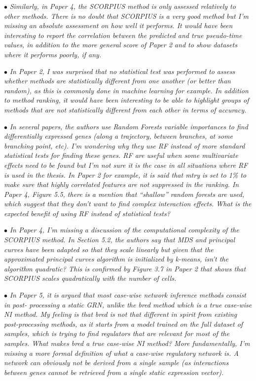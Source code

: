 \documentclass[10pt]{article}
\newcommand{\exam}[2][\  ]{\hspace{0pt}\marginpar{\color{red}#1}$\bullet$ \textit{#2}}
\newcommand{\imp}[1]{{\color{red} #1}}
\newcommand{\bigexclaim}{\raisebox{-0.1em}{\BigTriangleUp}\hspace{-0.32em}\llap{\small\textbf{!}}\hspace{0.32em}}
\newcommand{\tagimp}{\bigexclaim}
\begin{document}
{\exam{Similarly, in Paper 4, the SCORPIUS method is only assessed relatively to other methods.
	There is no doubt that SCORPIUS is a very good method but I’m missing an absolute
	assessment on how well it performs. It would have been interesting to report the correlation
	between the predicted and true pseudo-time values, in addition to the more general score of
	Paper 2 and to show datasets where it performs poorly, if any.}

\exam[\tagimp]{\imp{In Paper 2, I was surprised that no statistical test was performed to assess whether methods
	are statistically different from one another} (or better than random), as this is commonly done
	in machine learning for example. In addition to method ranking, it would have been
	interesting to be able to highlight groups of methods that are not statistically different from
	each other in terms of accuracy.}

\exam[\tagimp]{In several papers, the authors use Random Forests variable importances to find differentially
	expressed genes (along a trajectory, between branches, at some branching point, etc). \imp{I’m
	wondering why they use RF instead of more standard statistical tests for finding these genes.}
	RF are useful when some multivariate effects need to be found but I’m not sure it is the case
	in all situations where RF is used in the thesis. In Paper 2 for example, it is said that mtry is
	set to 1\% to make sure that highly correlated features are not suppressed in the ranking. In
	Paper 4, Figure 5.5, there is a mention that “shallow” random forests are used, which suggest
	that they don’t want to find complex interaction effects. What is the expected benefit of
	using RF instead of statistical tests?}

\exam[\tagimp]{In Paper 4, \imp{I’m missing a discussion of the computational complexity of the SCORPIUS
	method.} In Section 5.2, the authors say that MDS and principal curves have been adapted so
	that they scale linearly but given that the approximated principal curves algorithm is
	initialized by k-means, isn’t the algorithm quadratic? This is confirmed by Figure 3.7 in
	Paper 2 that shows that SCORPIUS scales quadratically with the number of cells.}

\exam[\tagimp]{In Paper 5, it is argued that most case-wise network inference methods consist in post-
	processing a static GRN, unlike the bred method which is a true case-wise NI method. My
	feeling is that bred is not that different in spirit from existing post-processing methods, as it
	starts from a model trained on the full dataset of samples, which is trying to find regulators
	that are relevant for most of the samples. \imp{What makes bred a true case-wise NI method?}
	More fundamentally, \imp{I’m missing a more formal definition of what a case-wise regulatory
	network is.} A network can obviously not be derived from a single sample (as interactions
	between genes cannot be retrieved from a single static expression vector).}

}
\end{document}
